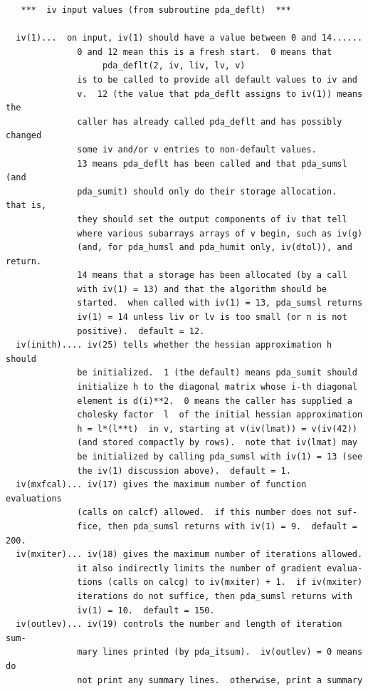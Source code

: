 \documentclass[11pt,twoside]{article}
\begin{document}
\begin{verbatim}
   ***  iv input values (from subroutine pda_deflt)  ***
 
  iv(1)...  on input, iv(1) should have a value between 0 and 14......
              0 and 12 mean this is a fresh start.  0 means that
                   pda_deflt(2, iv, liv, lv, v)
              is to be called to provide all default values to iv and
              v.  12 (the value that pda_deflt assigns to iv(1)) means the
              caller has already called pda_deflt and has possibly changed
              some iv and/or v entries to non-default values.
              13 means pda_deflt has been called and that pda_sumsl (and
              pda_sumit) should only do their storage allocation.  that is,
              they should set the output components of iv that tell
              where various subarrays arrays of v begin, such as iv(g)
              (and, for pda_humsl and pda_humit only, iv(dtol)), and return.
              14 means that a storage has been allocated (by a call
              with iv(1) = 13) and that the algorithm should be
              started.  when called with iv(1) = 13, pda_sumsl returns
              iv(1) = 14 unless liv or lv is too small (or n is not
              positive).  default = 12.
  iv(inith).... iv(25) tells whether the hessian approximation h should
              be initialized.  1 (the default) means pda_sumit should
              initialize h to the diagonal matrix whose i-th diagonal
              element is d(i)**2.  0 means the caller has supplied a
              cholesky factor  l  of the initial hessian approximation
              h = l*(l**t)  in v, starting at v(iv(lmat)) = v(iv(42))
              (and stored compactly by rows).  note that iv(lmat) may
              be initialized by calling pda_sumsl with iv(1) = 13 (see
              the iv(1) discussion above).  default = 1.
  iv(mxfcal)... iv(17) gives the maximum number of function evaluations
              (calls on calcf) allowed.  if this number does not suf-
              fice, then pda_sumsl returns with iv(1) = 9.  default = 200.
  iv(mxiter)... iv(18) gives the maximum number of iterations allowed.
              it also indirectly limits the number of gradient evalua-
              tions (calls on calcg) to iv(mxiter) + 1.  if iv(mxiter)
              iterations do not suffice, then pda_sumsl returns with
              iv(1) = 10.  default = 150.
  iv(outlev)... iv(19) controls the number and length of iteration sum-
              mary lines printed (by pda_itsum).  iv(outlev) = 0 means do
              not print any summary lines.  otherwise, print a summary

\end{verbatim}
\end{document}
